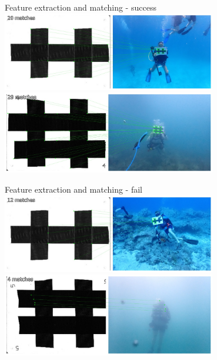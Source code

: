 \begin{frame}{Feature extraction and matching - success}
    \centering
    \includegraphics[height=0.7\textheight,width=0.7\textwidth,keepaspectratio]{images/fs_success1.JPG}
    \includegraphics[height=0.7\textheight,width=0.7\textwidth,keepaspectratio]{images/fs_success2.JPG}
\end{frame}

\begin{frame}{Feature extraction and matching - fail}
    \centering
    \includegraphics[height=0.7\textheight,width=0.7\textwidth,keepaspectratio]{images/fs_fail1.JPG}
    \includegraphics[height=0.7\textheight,width=0.7\textwidth,keepaspectratio]{images/fs_fail2.JPG}
\end{frame}

